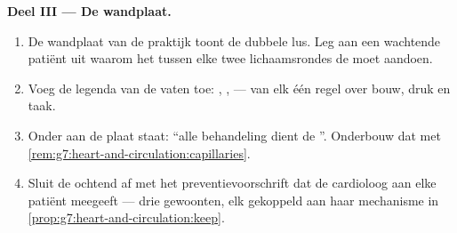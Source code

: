 \begin{problem}
\medskip\noindent\textbf{Deel III --- De wandplaat.}
\begin{enumerate}[resume]
  \item De wandplaat van de praktijk toont de dubbele lus. Leg aan een
        wachtende patiënt uit waarom het  tussen elke twee
        lichaamsrondes de  moet aandoen.
  \item Voeg de legenda van de vaten toe: , ,  --- van
        elk één regel over bouw, druk en taak.
  \item Onder aan de plaat staat: ``alle behandeling dient de
        ''. Onderbouw dat met
        \cref{rem:g7:heart-and-circulation:capillaries}.
  \item Sluit de ochtend af met het preventievoorschrift dat de cardioloog
        aan elke patiënt meegeeft --- drie gewoonten, elk gekoppeld aan
        haar mechanisme in
        \cref{prop:g7:heart-and-circulation:keep}.
\end{enumerate}
\end{problem}
